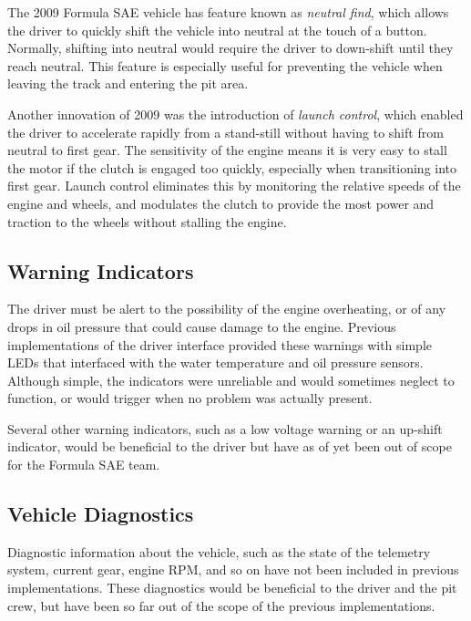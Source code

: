 The 2009 Formula SAE vehicle has feature known as \emph{neutral find}, which allows the driver to quickly shift the vehicle into neutral at the touch of a button. Normally, shifting into neutral would require the driver to down-shift until they reach neutral. This feature is especially useful for preventing the vehicle when leaving the track and entering the pit area. 

Another innovation of 2009 was the introduction of \emph{launch control}, which enabled the driver to accelerate rapidly from a stand-still without having to shift from neutral to first gear. The sensitivity of the engine means it is very easy to stall the motor if the clutch is engaged too quickly, especially when transitioning into first gear. Launch control eliminates this by monitoring the relative speeds of the engine and wheels, and modulates the clutch to provide the most power and traction to the wheels without stalling the engine. 
 
\subsection{Warning Indicators}

The driver must be alert to the possibility of the engine overheating, or of any drops in oil pressure that could cause damage to the engine. Previous implementations of the driver interface provided these warnings with simple LEDs that interfaced with the water temperature and oil pressure sensors. Although simple, the indicators were unreliable and would sometimes neglect to function, or would trigger when no problem was actually present. 

Several other warning indicators, such as a low voltage warning or an up-shift indicator, would be beneficial to the driver but have as of yet been out of scope for the Formula SAE team.

\subsection{Vehicle Diagnostics}

Diagnostic information about the vehicle, such as the state of the telemetry system, current gear, engine RPM, and so on have not been included in previous implementations. These diagnostics would be beneficial to the driver and the pit crew, but have been so far out of the scope of the previous implementations.

